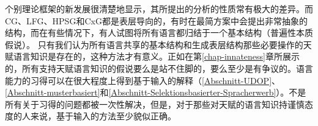 个别理论框架的新发展很清楚地显示，其所提出的分析的性质常有极大的差异。而CG、LFG、HPSG和CxG都是表层导向的，有时在最简方案中会提出非常抽象的结构，而在有些情况下，有人试图将所有语言都归结于一个基本结构（普遍性本质假说）。 只有我们认为所有语言共享的基本结构和生成表层结构那些必要操作的天赋语言知识是存在的，这种方法才有意义。正如在第\ref{chap-innateness}章所展示的，所有支持天赋语言知识的假说要么是站不住脚的，要么至少是有争议的。语言能力的习得可以在很大程度上得到基于输入的解释（\ref{Abschnitt-UDOP}、\ref{Abschnitt-musterbasiert}和\ref{Abschnitt-Selektionsbasierter-Spracherwerb}）。不是所有关于习得的问题都被一次性解决，但是，对于那些对天赋的语言知识持谨慎态度的人来说，基于输入的方法至少貌似正确。

